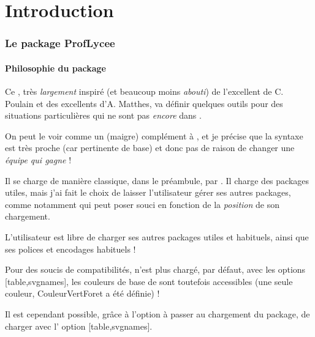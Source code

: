 \part{Introduction}

\section{Le package ProfLycee}

\subsection{\og Philosophie \fg{} du package}

\begin{noteblock}
Ce , très \textit{largement} inspiré (et beaucoup moins \textit{abouti}) de l'excellent  de C. Poulain et des excellents  d'A. Matthes, va définir quelques outils pour des situations particulières qui ne sont pas \textit{encore} dans .

On peut le voir comme un (maigre) complément à , et je précise que la syntaxe est très proche (car pertinente de base) et donc pas de raison de changer une \textit{équipe qui gagne} !

\medskip

Il se charge de manière classique, dans le préambule, par . Il charge des {packages} utiles, mais j'ai fait le choix de laisser l'utilisateur gérer ses autres {packages}, comme notamment  qui peut poser souci en fonction de la \textit{position} de son chargement.

L'utilisateur est libre de charger ses autres {packages} utiles et habituels, ainsi que ses \textsf{polices} et \textsf{encodages} habituels !
\end{noteblock}

\begin{cautionblock}
 Pour des soucis de compatibilités,  n'est plus chargé, par défaut, avec les options \textsf{[table,svgnames]}, les couleurs de base de  sont toutefois accessibles (une seule couleur, \textsf{CouleurVertForet} a été définie) !

Il est cependant possible, grâce à l'option \Cle{[xcolor]} à passer au chargement du package, de charger  avec l' option \textsf{[table,svgnames]}.
\end{cautionblock}

